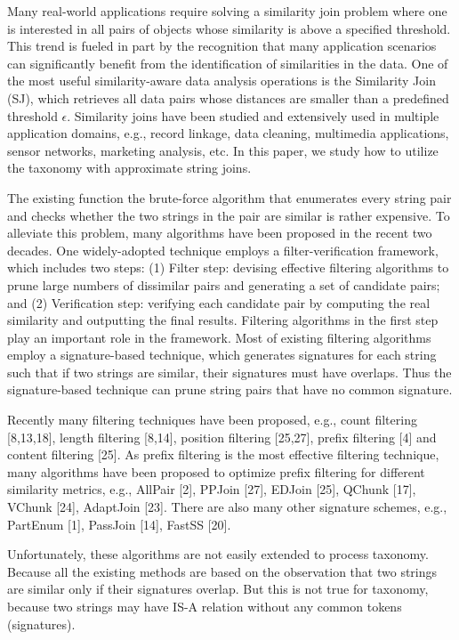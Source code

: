 Many real-world applications require solving a similarity join problem where one is interested in all pairs of objects whose
similarity is above a specified threshold. This trend is fueled in part by the
recognition that many application scenarios can significantly
benefit from the identification of similarities in the data. One
of the most useful similarity-aware data analysis operations is
the Similarity Join (SJ), which retrieves all data pairs whose
distances are smaller than a predefined threshold $\epsilon$. Similarity
joins have been studied and extensively used in multiple application
domains, e.g., record linkage, data cleaning, multimedia
applications, sensor networks, marketing analysis, etc. In this paper, we study how to utilize the taxonomy with approximate string joins.



The existing function the brute-force algorithm that enumerates every string pair and checks whether the two strings in the pair are similar is rather expensive. To alleviate this problem, many algorithms have been proposed in the recent two decades. One widely-adopted technique employs a filter-verification framework, which includes two steps: (1) Filter step: devising effective filtering algorithms to prune large numbers of dissimilar pairs and generating a set of candidate pairs; and (2) Verification step: verifying each candidate pair by computing
the real similarity and outputting the final results. Filtering algorithms in the first step play an important role
in the framework. Most of existing filtering algorithms employ a signature-based technique, which generates signatures for each string such that if two strings are similar, their signatures must have overlaps. Thus the signature-based technique can prune string pairs that have no common signature.

Recently many filtering techniques have been proposed, e.g., count filtering [8,13,18], length filtering [8,14], position
filtering [25,27], prefix filtering [4] and content filtering [25]. As prefix filtering is the most effective filtering technique,
many algorithms have been proposed to optimize prefix filtering for different similarity metrics, e.g., AllPair [2],
PPJoin [27], EDJoin [25], QChunk [17], VChunk [24], AdaptJoin [23]. There are also many other signature schemes, e.g., PartEnum [1],
PassJoin [14], FastSS [20].

Unfortunately, these algorithms are not easily extended to process taxonomy. Because all the existing methods are based on the observation that two strings are similar only if their signatures overlap. But this is not true for taxonomy, because two strings may have IS-A relation without any common tokens (signatures).


